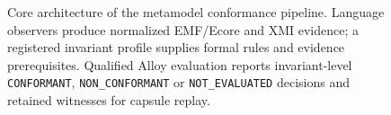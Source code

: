 \documentclass[journal]{IEEEtran}
\begin{document}
\begin{figure}[t]
\centering
\resizebox{\textwidth}{!}{}
\caption{Core architecture of the metamodel conformance pipeline. Language observers produce normalized EMF/Ecore and XMI evidence; a registered invariant profile supplies formal rules and evidence prerequisites. Qualified Alloy evaluation reports invariant-level \texttt{CONFORMANT}, \texttt{NON\_CONFORMANT} or \texttt{NOT\_EVALUATED} decisions and retained witnesses for capsule replay.}
\label{fig:core-pipeline}
\end{figure}
\null\newpage
\null\newpage
\end{document}
